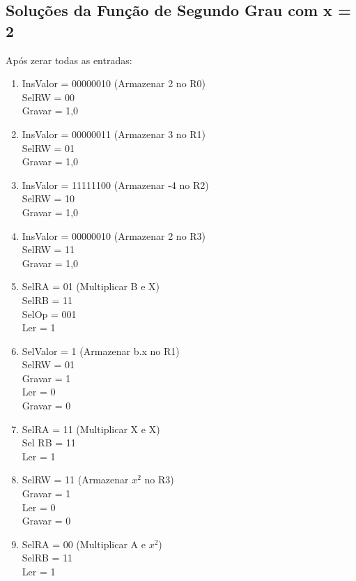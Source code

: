 \documentclass[]{article}
\begin{document}
	\subsection{Soluções da Função de Segundo Grau com x = 2}
		Após zerar todas as entradas:
		\begin{enumerate}
			\item InsValor = 00000010 (Armazenar 2 no R0)
			\\ SelRW = 00
			\\ Gravar = 1,0
			
			\item InsValor = 00000011 (Armazenar 3 no R1)
			\\ SelRW = 01
			\\ Gravar = 1,0
			
			\item InsValor = 11111100 (Armazenar -4 no R2)
			\\ SelRW = 10
			\\ Gravar = 1,0
			
			\item InsValor = 00000010 (Armazenar 2 no R3)
			\\ SelRW = 11
			\\ Gravar = 1,0
			
			\item SelRA = 01 (Multiplicar B e X)
			\\ SelRB = 11
			\\ SelOp = 001
			\\ Ler = 1
			
			\item SelValor = 1 (Armazenar b.x no R1)
			\\ SelRW = 01
			\\ Gravar = 1
			\\ Ler = 0
			\\ Gravar = 0
			
			\item SelRA = 11 (Multiplicar X e X)
			\\ Sel RB = 11
			\\ Ler = 1
			
			\item SelRW = 11 (Armazenar $x^2$ no R3)
			\\ Gravar = 1
			\\ Ler = 0
			\\ Gravar = 0
			
			\item SelRA = 00 (Multiplicar A e $x^2$)
			\\ SelRB = 11
			\\ Ler = 1
			

\end{enumerate}
\end{document}
